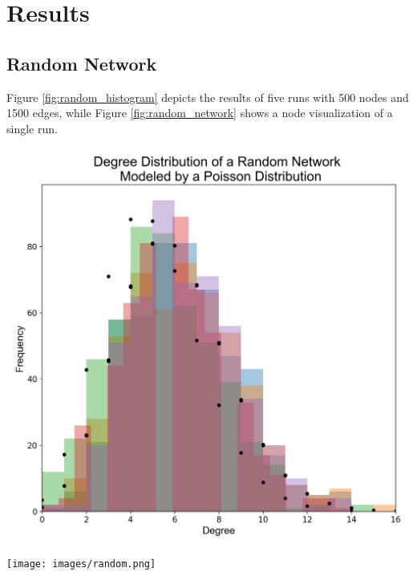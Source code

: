 \documentclass[journal]{IEEEtran}
\begin{document}
\newpage
\section{Results}

\subsection{Random Network}

\noindent Figure \ref{fig:random_histogram} depicts the results of five runs with 500 nodes and 1500 edges, while Figure \ref{fig:random_network} shows a node visualization of a single run.   

\begingroup
    \centering
    \medskip
    \includegraphics[width=\columnwidth]{images/rand_dist_5.png}
    \label{fig:random_histogram}
    \medskip
\endgroup

\bigskip
\bigskip
\bigskip

\begingroup
    \centering
    \medskip
    \texttt{[image: images/random.png]}
    \label{fig:random_network}
    \medskip
\endgroup
\end{document}
